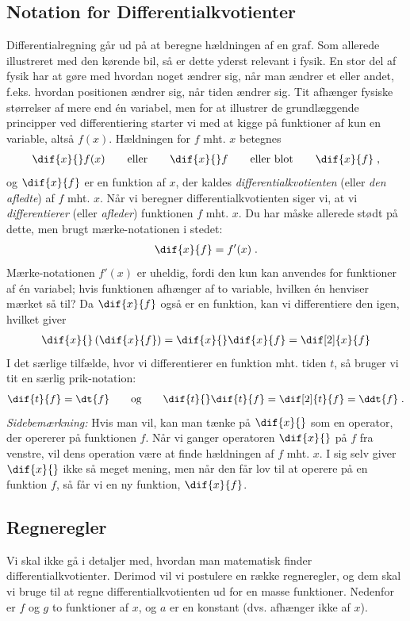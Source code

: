\subsection{Notation for Differentialkvotienter}
Differentialregning går ud på at beregne hældningen af en graf. Som
allerede illustreret med den kørende bil, så er dette yderst relevant
i fysik. En stor del af fysik har at gøre med hvordan noget ændrer
sig, når man ændrer et eller andet, f.eks. hvordan positionen ændrer
sig, når tiden ændrer sig. Tit afhænger fysiske størrelser af mere end
én variabel, men for at illustrer de grundlæggende principper ved differentiering starter vi med at kigge på funktioner af kun en variable, altså $f(x)$. Hældningen for $f$ mht. $x$ betegnes
\begin{align*}
\dif{x}{}f(x)
\qquad
\text{eller}
\qquad
\dif{x}{}f
\qquad
\text{eller blot}
\qquad
\dif{x}{f} \; ,
\end{align*}
og $\dif{x}{f}$ er en funktion af $x$, der kaldes \emph{differentialkvotienten} (eller \emph{den afledte}) af $f$ mht. $x$. Når vi beregner differentialkvotienten
siger vi, at vi \emph{differentierer} (eller \emph{afleder})
funktionen $f$ mht. $x$. Du har måske allerede stødt på dette, men
brugt mærke-notationen i stedet:
\begin{align*}
\dif{x}{f} = f'(x) \; .
\end{align*}
Mærke-notationen $f'(x)$ er uheldig, fordi den kun kan anvendes for
funktioner af én variabel; hvis funktionen afhænger af to variable,
hvilken én henviser mærket så til? Da $\dif{x}{f}$ også er en funktion,
kan vi differentiere den igen, hvilket giver
\begin{align*}
\dif{x}{} \left(\dif{x}{f}\right)
= \dif{x}{} \dif{x}{f}
= \dif[2]{x}{f}
\end{align*}
I det særlige tilfælde, hvor vi differentierer en funktion mht. tiden
$t$, så bruger vi tit en særlig prik-notation:
\begin{align*}
\dif{t}{f} = \dt{f}
\qquad
\text{og}
\qquad
\dif{t}{} \dif{t}{f} = \dif[2]{t}{f} = \ddt{f} \; .
\end{align*}
\textsl{Sidebemærkning:} Hvis man vil, kan man tænke på $\dif{x}{}$ som
en operator, der opererer på funktionen $f$. Når vi ganger operatoren
$\dif{x}{}$ på $f$ fra venstre, vil dens operation være at finde
hældningen af $f$ mht. $x$. I sig selv giver $\dif{x}{}$ ikke så meget
mening, men når den får lov til at operere på en funktion $f$, så får
vi en ny funktion, $\dif{x}{f}$.

\subsection{Regneregler}
Vi skal ikke gå i detaljer med, hvordan man matematisk finder
differentialkvotienter. Derimod vil vi postulere en række regneregler,
og dem skal vi bruge til at regne differentialkvotienten ud for en
masse funktioner. Nedenfor er $f$ og $g$ to funktioner af $x$, og $a$ er en
konstant (dvs. afhænger ikke af $x$).

